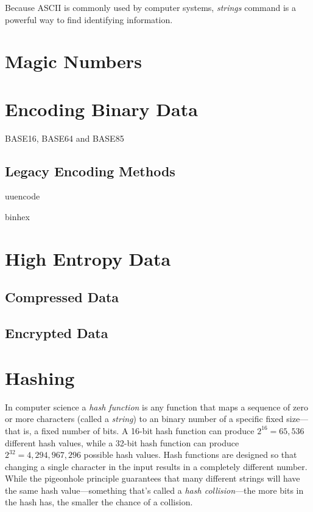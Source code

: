 Because ASCII is commonly used by computer systems, 
\emph{strings} command is a powerful way to find  identifying
information. 

\section{Magic Numbers}

\section{Encoding Binary Data}

BASE16, BASE64 and BASE85

\subsection{Legacy Encoding Methods}
uuencode

binhex


\section{High Entropy Data}
\subsection{Compressed Data}
\subsection{Encrypted Data}

\section{Hashing}

In computer science a \emph{hash function} is any function that maps a
sequence of zero or more characters (called a \emph{string}) to an
binary number of a specific fixed size---that is, a fixed number of
bits. A 16-bit hash function can produce $2^{16}=65,536$ different hash values, while a
32-bit hash function can produce $2^{32}=4,294,967,296$ possible hash
values. Hash functions are designed so that changing a single
character in the input results in a completely different number. While
the pigeonhole principle guarantees that many different strings will
have the same hash value---something that's called a \emph{hash
  collision}---the more bits in the hash has, the smaller the chance
of a collision.

